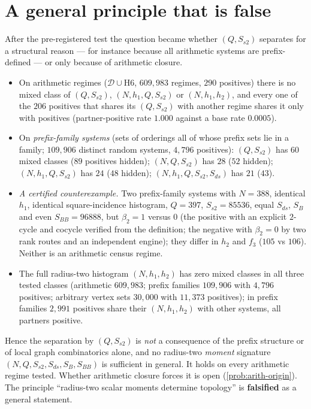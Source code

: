\section{A general principle that is false}\label{sec:principle-false}
After the pre-registered test the question became whether $(Q,S_{s2})$ separates for a structural reason --- for instance because all arithmetic systems are prefix-defined --- or only because of arithmetic closure.
\begin{observation}\label{obs:S2-falsified}
\begin{itemize}[nosep]
\item On arithmetic regimes ($\mathcal D\cup$H6, $609{,}983$ regimes, $290$ positives) there is no mixed class of $(Q,S_{s2})$, $(N,h_1,Q,S_{s2})$ or $(N,h_1,h_2)$, and every one of the $206$ positives that shares its $(Q,S_{s2})$ with another regime shares it only with positives (partner-positive rate $1.000$ against a base rate $0.0005$).
\item On \emph{prefix-family systems} (sets of orderings all of whose prefix sets lie in a family; $109{,}906$ distinct random systems, $4{,}796$ positives): $(Q,S_{s2})$ has $60$ mixed classes ($89$ positives hidden); $(N,Q,S_{s2})$ has $28$ ($52$ hidden); $(N,h_1,Q,S_{s2})$ has $24$ ($48$ hidden); $(N,h_1,Q,S_{s2},S_{ds})$ has $21$ ($43$).
\item \emph{A certified counterexample.} Two prefix-family systems with $N=388$, identical $h_1$, identical square-incidence histogram, $Q=397$, $S_{s2}=85536$, equal $S_{ds}$, $S_B$ and even $S_{BB}=96888$, but $\beta_2=1$ versus $0$ (the positive with an explicit $2$-cycle and cocycle verified from the definition; the negative with $\beta_2=0$ by two rank routes and an independent engine); they differ in $h_2$ and $f_3$ ($105$ vs $106$). Neither is an arithmetic census regime.
\item The full radius-two histogram $(N,h_1,h_2)$ has zero mixed classes in all three tested classes (arithmetic $609{,}983$; prefix families $109{,}906$ with $4{,}796$ positives; arbitrary vertex sets $30{,}000$ with $11{,}373$ positives); in prefix families $2{,}991$ positives share their $(N,h_1,h_2)$ with other systems, all partners positive.
\end{itemize}
Hence the separation by $(Q,S_{s2})$ is \emph{not} a consequence of the prefix structure or of local graph combinatorics alone, and no radius-two \emph{moment} signature $(N,Q,S_{s2},S_{ds},S_B,S_{BB})$ is sufficient in general. It holds on every arithmetic regime tested. Whether arithmetic closure forces it is open (\cref{prob:arith-origin}). The principle ``radius-two scalar moments determine topology'' is \textbf{falsified} as a general statement.
\end{observation}
